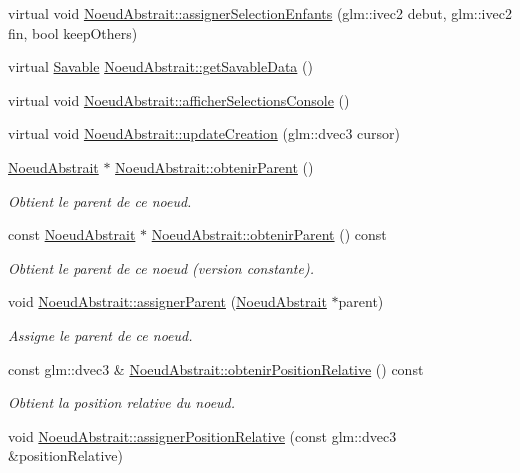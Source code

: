 \begin{DoxyCompactItemize}
\item 
virtual void \hyperlink{group__inf2990_ga7304995555625461f49b1e75dd81e888}{Noeud\+Abstrait\+::assigner\+Selection\+Enfants} (glm\+::ivec2 debut, glm\+::ivec2 fin, bool keep\+Others)
\item 
virtual \hyperlink{class_savable}{Savable} \hyperlink{group__inf2990_ga1729231ec41b3ba4d6668eba101ead44}{Noeud\+Abstrait\+::get\+Savable\+Data} ()
\item 
virtual void \hyperlink{group__inf2990_gabd4eaa5eef18dc3a12fa140086238b5f}{Noeud\+Abstrait\+::afficher\+Selections\+Console} ()
\item 
virtual void \hyperlink{group__inf2990_ga233fd4600812176c557bb94ea04da5c9}{Noeud\+Abstrait\+::update\+Creation} (glm\+::dvec3 cursor)
\item 
\hyperlink{class_noeud_abstrait}{Noeud\+Abstrait} $\ast$ \hyperlink{group__inf2990_gaa2ac8c4cd02d88c312b92c65e07ed6d9}{Noeud\+Abstrait\+::obtenir\+Parent} ()
\begin{DoxyCompactList}\small\item\em Obtient le parent de ce noeud. \end{DoxyCompactList}\item 
const \hyperlink{class_noeud_abstrait}{Noeud\+Abstrait} $\ast$ \hyperlink{group__inf2990_gaf063d208bc4764b1fd2c4e76ec0469b9}{Noeud\+Abstrait\+::obtenir\+Parent} () const 
\begin{DoxyCompactList}\small\item\em Obtient le parent de ce noeud (version constante). \end{DoxyCompactList}\item 
void \hyperlink{group__inf2990_ga7787ab59ecc1e6119287459a7154f307}{Noeud\+Abstrait\+::assigner\+Parent} (\hyperlink{class_noeud_abstrait}{Noeud\+Abstrait} $\ast$parent)
\begin{DoxyCompactList}\small\item\em Assigne le parent de ce noeud. \end{DoxyCompactList}\item 
const glm\+::dvec3 \& \hyperlink{group__inf2990_ga62d73f67c3b33e2cb106630bd1736a58}{Noeud\+Abstrait\+::obtenir\+Position\+Relative} () const 
\begin{DoxyCompactList}\small\item\em Obtient la position relative du noeud. \end{DoxyCompactList}\item 
void \hyperlink{group__inf2990_ga11e12e42b05a5327c92cd7fd1b7e5a24}{Noeud\+Abstrait\+::assigner\+Position\+Relative} (const glm\+::dvec3 \&position\+Relative)

\end{DoxyCompactItemize}
